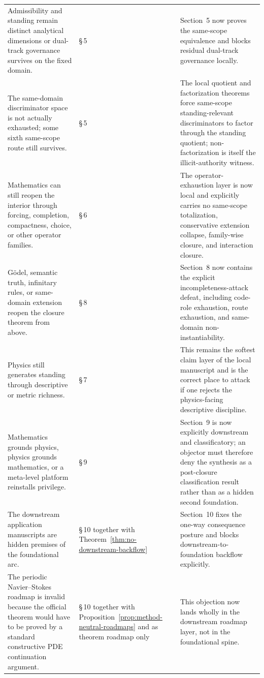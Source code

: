 \begin{longtable}{P{0.34\textwidth}P{0.28\textwidth}P{0.26\textwidth}}
Admissibility and standing remain distinct analytical dimensions or dual-track governance survives on the fixed domain. & \S\,5 & Section~5 now proves the same-scope equivalence and blocks residual dual-track governance locally. \\
The same-domain discriminator space is not actually exhausted; some sixth same-scope route still survives. & \S\,5 & The local quotient and factorization theorems force same-scope standing-relevant discriminators to factor through the standing quotient; non-factorization is itself the illicit-authority witness. \\
Mathematics can still reopen the interior through forcing, completion, compactness, choice, or other operator families. & \S\,6 & The operator-exhaustion layer is now local and explicitly carries no same-scope totalization, conservative extension collapse, family-wise closure, and interaction closure. \\
G\"odel, semantic truth, infinitary rules, or same-domain extension reopen the closure theorem from above. & \S\,8 & Section~8 now contains the explicit incompleteness-attack defeat, including code-role exhaustion, route exhaustion, and same-domain non-instantiability. \\
Physics still generates standing through descriptive or metric richness. & \S\,7 & This remains the softest claim layer of the local manuscript and is the correct place to attack if one rejects the physics-facing descriptive discipline. \\
Mathematics grounds physics, physics grounds mathematics, or a meta-level platform reinstalls privilege. & \S\,9 & Section~9 is now explicitly downstream and classificatory; an objector must therefore deny the synthesis as a post-closure classification result rather than as a hidden second foundation. \\
The downstream application manuscripts are hidden premises of the foundational arc. & \S\,10 together with Theorem~\ref{thm:no-downstream-backflow} & Section~10 fixes the one-way consequence posture and blocks downstream-to-foundation backflow explicitly. \\
The periodic Navier--Stokes roadmap is invalid because the official theorem would have to be proved by a standard constructive PDE continuation argument. & \S\,10 together with Proposition~\ref{prop:method-neutral-roadmaps} and \nsdoc{} as theorem roadmap only & This objection now lands wholly in the downstream roadmap layer, not in the foundational spine. \\

\end{longtable}
